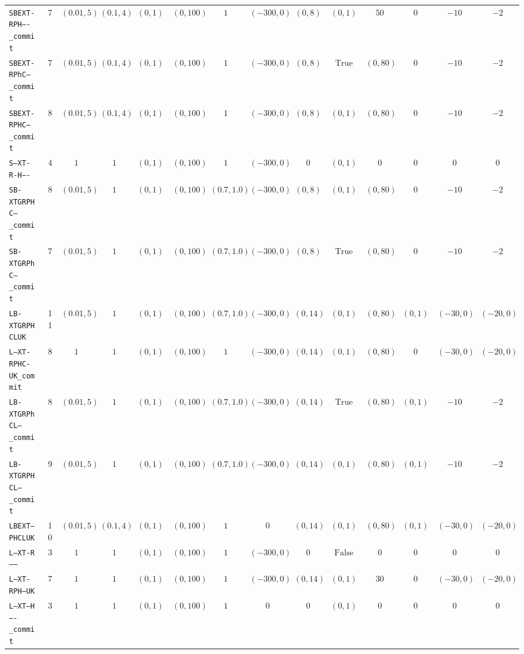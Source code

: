 {\begin{tabular}{lccccccccccccc}
\texttt{SBEXT-RPH----_commit} & 7 & $(0.01,5)$ & $(0.1,4)$ & $(0,1)$ & $(0,100)$ & $1$ & $(-300,0)$ & $(0,8)$ & $(0,1)$ & $50$ & $0$ & $-10$ & $-2$ \\
\texttt{SBEXT-RPhC---_commit} & 7 & $(0.01,5)$ & $(0.1,4)$ & $(0,1)$ & $(0,100)$ & $1$ & $(-300,0)$ & $(0,8)$ & $\mathrm{True}$ & $(0,80)$ & $0$ & $-10$ & $-2$ \\
\texttt{SBEXT-RPHC---_commit} & 8 & $(0.01,5)$ & $(0.1,4)$ & $(0,1)$ & $(0,100)$ & $1$ & $(-300,0)$ & $(0,8)$ & $(0,1)$ & $(0,80)$ & $0$ & $-10$ & $-2$ \\
\texttt{S--XT-R-H----} & 4 & $1$ & $1$ & $(0,1)$ & $(0,100)$ & $1$ & $(-300,0)$ & $0$ & $(0,1)$ & $0$ & $0$ & $0$ & $0$ \\
\texttt{SB-XTGRPHC---_commit} & 8 & $(0.01,5)$ & $1$ & $(0,1)$ & $(0,100)$ & $(0.7,1.0)$ & $(-300,0)$ & $(0,8)$ & $(0,1)$ & $(0,80)$ & $0$ & $-10$ & $-2$ \\
\texttt{SB-XTGRPhC---_commit} & 7 & $(0.01,5)$ & $1$ & $(0,1)$ & $(0,100)$ & $(0.7,1.0)$ & $(-300,0)$ & $(0,8)$ & $\mathrm{True}$ & $(0,80)$ & $0$ & $-10$ & $-2$ \\
\texttt{LB-XTGRPHCLUK} & 11 & $(0.01,5)$ & $1$ & $(0,1)$ & $(0,100)$ & $(0.7,1.0)$ & $(-300,0)$ & $(0,14)$ & $(0,1)$ & $(0,80)$ & $(0,1)$ & $(-30,0)$ & $(-20,0)$ \\
\texttt{L--XT-RPHC-UK_commit} & 8 & $1$ & $1$ & $(0,1)$ & $(0,100)$ & $1$ & $(-300,0)$ & $(0,14)$ & $(0,1)$ & $(0,80)$ & $0$ & $(-30,0)$ & $(-20,0)$ \\
\texttt{LB-XTGRPhCL--_commit} & 8 & $(0.01,5)$ & $1$ & $(0,1)$ & $(0,100)$ & $(0.7,1.0)$ & $(-300,0)$ & $(0,14)$ & $\mathrm{True}$ & $(0,80)$ & $(0,1)$ & $-10$ & $-2$ \\
\texttt{LB-XTGRPHCL--_commit} & 9 & $(0.01,5)$ & $1$ & $(0,1)$ & $(0,100)$ & $(0.7,1.0)$ & $(-300,0)$ & $(0,14)$ & $(0,1)$ & $(0,80)$ & $(0,1)$ & $-10$ & $-2$ \\
\texttt{LBEXT--PHCLUK} & 10 & $(0.01,5)$ & $(0.1,4)$ & $(0,1)$ & $(0,100)$ & $1$ & $0$ & $(0,14)$ & $(0,1)$ & $(0,80)$ & $(0,1)$ & $(-30,0)$ & $(-20,0)$ \\
\texttt{L--XT-R------} & 3 & $1$ & $1$ & $(0,1)$ & $(0,100)$ & $1$ & $(-300,0)$ & $0$ & $\mathrm{False}$ & $0$ & $0$ & $0$ & $0$ \\
\texttt{L--XT-RPH--UK} & 7 & $1$ & $1$ & $(0,1)$ & $(0,100)$ & $1$ & $(-300,0)$ & $(0,14)$ & $(0,1)$ & $30$ & $0$ & $(-30,0)$ & $(-20,0)$ \\
\texttt{L--XT---H----_commit} & 3 & $1$ & $1$ & $(0,1)$ & $(0,100)$ & $1$ & $0$ & $0$ & $(0,1)$ & $0$ & $0$ & $0$ & $0$ \\

\end{tabular}}
